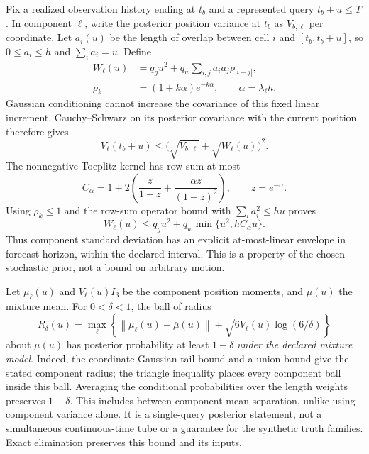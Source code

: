 \documentclass[journal]{IEEEtran}
\newcommand{\norm}[1]{\left\lVert#1\right\rVert}
\begin{document}
Fix a realized observation history ending at $t_b$ and a represented
query $t_b+u\leq T$. In component $\ell$, write the posterior position
variance at $t_b$ as $V_{b,\ell}$ per coordinate. Let $a_i(u)$ be the
length of overlap between cell $i$ and $[t_b,t_b+u]$, so
$0\leq a_i\leq h$ and $\sum_i a_i=u$. Define
\begin{align}
 W_\ell(u)&=q_g u^2+q_w\sum_{i,j}a_i a_j\rho_{|i-j|},\\
 \rho_k&=(1+k\alpha)e^{-k\alpha},\qquad\alpha=\lambda_\ell h.
\end{align}
Gaussian conditioning cannot increase the covariance of this fixed
linear increment. Cauchy--Schwarz on its posterior covariance with the
current position therefore gives
\begin{equation}
 V_\ell(t_b+u)\leq\bigl(\sqrt{V_{b,\ell}}+\sqrt{W_\ell(u)}\bigr)^2.
 \label{eq:variance-growth}
\end{equation}
The nonnegative Toeplitz kernel has row sum at most
\begin{equation}
 C_\alpha=1+2\left(\frac{z}{1-z}+\frac{\alpha z}{(1-z)^2}\right),
 \qquad z=e^{-\alpha}.
\end{equation}
Using $\rho_k\leq1$ and the row-sum operator bound with
$\sum_i a_i^2\leq hu$ proves
\begin{equation}
 W_\ell(u)\leq q_g u^2+q_w\min\{u^2,hC_\alpha u\}.
 \label{eq:increment-growth}
\end{equation}
Thus component standard deviation has an explicit at-most-linear
envelope in forecast horizon, within the declared interval. This is a
property of the chosen stochastic prior, not a bound on arbitrary motion.

Let $\mu_\ell(u)$ and $V_\ell(u)I_3$ be the component position moments,
and $\bar\mu(u)$ the mixture mean. For $0<\delta<1$, the ball of radius
\begin{equation}
 R_\delta(u)=\max_\ell\left\{\norm{\mu_\ell(u)-\bar\mu(u)}
 +\sqrt{6V_\ell(u)\log(6/\delta)}\right\}
 \label{eq:mixture-ball}
\end{equation}
about $\bar\mu(u)$ has posterior probability at least $1-\delta$
\emph{under the declared mixture model}. Indeed, the coordinate Gaussian
tail bound and a union bound give the stated component radius; the
triangle inequality places every component ball inside this ball.
Averaging the conditional probabilities over the length weights preserves
$1-\delta$. This includes between-component mean separation, unlike
using component variance alone. It is a single-query posterior statement,
not a simultaneous continuous-time tube or a guarantee for the synthetic
truth families. Exact elimination preserves this bound and its inputs.
\end{document}
